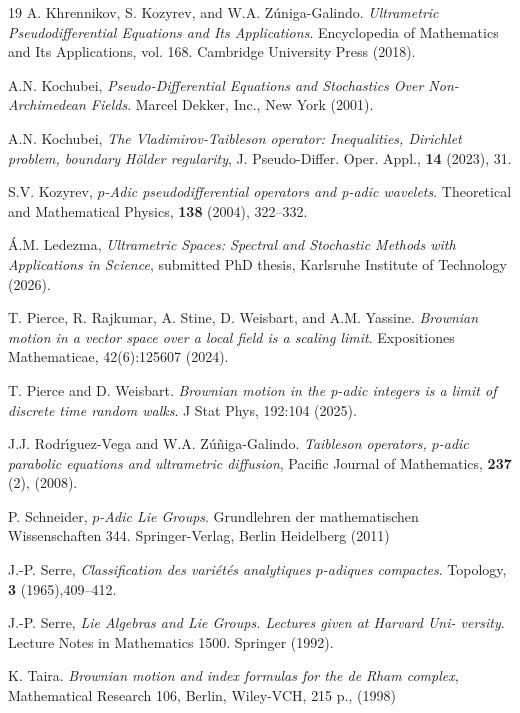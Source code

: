 \documentclass[a4paper,draft]{ZbRad}
\theoremstyle{plain}
\theoremstyle{definition}
\numberwithin{equation}{section}
\begin{document}
\begin{thebibliography}{19}
A. Khrennikov, S. Kozyrev, and W.A. Zúniga-Galindo. \emph{Ultrametric Pseudodifferential Equations and Its Applications}. Encyclopedia of Mathematics and Its Applications, vol. 168. Cambridge University Press (2018).

A.N. Kochubei, \emph{Pseudo-Diﬀerential Equations and Stochastics Over Non-Archimedean Fields}. Marcel Dekker, Inc., New York (2001).

A.N. Kochubei, \emph{The Vladimirov-Taibleson operator: Inequalities,
Dirichlet problem, boundary Hölder regularity}, J. Pseudo-Diﬀer. Oper.
Appl., \textbf{14} (2023), 31.

S.V. Kozyrev, \emph{$p$-Adic pseudodiﬀerential operators and p-adic wavelets}.
Theoretical and Mathematical Physics, \textbf{138} (2004), 322--332.

Á.M. Ledezma, \emph{Ultrametric Spaces: Spectral and Stochastic
Methods with Applications in Science},
submitted PhD thesis, Karlsruhe Institute of Technology (2026).

T. Pierce, R. Rajkumar, A. Stine, D. Weisbart, and A.M. Yassine. \emph{Brownian motion in a vector space over a local field is a scaling limit}. Expositiones Mathematicae, 42(6):125607 (2024).

T. Pierce and D. Weisbart. \emph{Brownian motion in the p-adic integers is a
limit of discrete time random walks}. J Stat Phys, 192:104 (2025).

J.J. Rodr\'{\i}guez-Vega and W.A. Z\'u\~niga-Galindo.
\emph{Taibleson operators, $p$-adic parabolic equations and ultrametric diffusion},
Pacific Journal of Mathematics,
\textbf{237} (2), 
(2008).

P. Schneider, \emph{$p$-Adic Lie Groups}. Grundlehren der mathematischen Wissenschaften 344. Springer-Verlag, Berlin Heidelberg (2011)

J.-P. Serre, \emph{Classiﬁcation des variétés analytiques $p$-adiques compactes}.
Topology, {\bf 3} (1965),409--412.

J.-P. Serre, \emph{Lie Algebras and Lie Groups. Lectures given at Harvard Uni-
versity}. Lecture Notes in Mathematics 1500. Springer (1992).

K. Taira. \emph{Brownian motion and index formulas for the de {Rham} complex},
{Mathematical Research 106},
{Berlin},
{Wiley-VCH},
{215 p.},
(1998)


\end{thebibliography}
\end{document}
